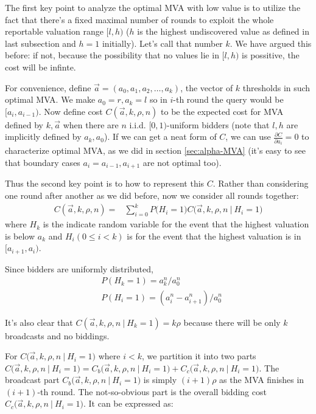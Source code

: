 The first key point to analyze the optimal MVA with low value is to utilize
the fact that there's a fixed maximal number of rounds to exploit the whole
reportable valuation range $[l, h)$ ($h$ is the highest undiscovered
value as defined in last subsection and $h = 1$ initially). Let's call that
number $k$. We have argued this before: if not, because the possibility that no
values lie in $[l, h)$ is possitive, the cost will be infinte.

For convenience, define $\vec a = (a_0, a_1, a_2, \ldots, a_k)$, the vector of
$k$ thresholds in such optimal MVA. We make $a_0 = r, a_k = l$ so in $i$-th
round the query would be $[a_i, a_{i-1})$. Now define cost $C(\vec a, k, \rho,
n)$ to be the expected cost for MVA defined by $k, \vec a$ when there are $n$
i.i.d.  $[0, 1)$-uniform bidders (note that $l, h$ are implicitly defined by
$a_k, a_0$). If we can get a neat form of $C$, we can use $\frac{\partial
C}{\partial a_i} = 0 $ to characterize optimal MVA, as we did in section
\ref{sec:alpha-MVA} (it's easy to see that boundary cases $a_i = a_{i-1},
a_{i+1}$ are not optimal too).

Thus the second key point is to how to represent this $C$. Rather than
considering one round after another as we did before, now we consider all
rounds together:
\begin{align*}
C(\vec a, k, \rho, n) =
&\sum_{i=0}^k P\big(H_i = 1\big) C\big(\vec a, k, \rho, n ~\big|~ H_i = 1 \big)
\end{align*}
where $H_k$ is the indicate random variable for the event that the highest
valuation is below $a_k$ and $H_i(0 \leq i < k)$ is for the event that the highest
valuation is in $[a_{i+1}, a_i)$.

Since bidders are uniformly distributed,
\begin{align*}
  &P(H_k = 1) = a_k^n / a_0^n\\
    &P(H_i = 1) = (a_{i}^n-a_{i+1}^n) / a_0^n
\end{align*}

It's also clear that $C(\vec a, k, \rho, n ~\big|~ H_k = 1) = k\rho$ because
there will be only $k$ broadcasts and no biddings.

For $C\big(\vec a, k, \rho, n ~\big|~ H_i = 1\big)$ where $i < k$, we partition
it into two parts $C\big(\vec a, k, \rho, n ~\big|~ H_i = 1\big) = C_b\big(\vec
a, k, \rho, n ~\big|~ H_i = 1\big) + C_c\big(\vec a, k, \rho, n ~\big|~ H_i =
1\big)$. The broadcast part $C_b\big(\vec a, k, \rho, n ~\big|~ H_i = 1 \big)$
is simply $(i+1)\rho$ as the MVA finishes in $(i+1)$-th round. The
not-so-obvious part is the overall bidding cost $C_c\big(\vec a, k, \rho, n
~\big|~ H_i = 1 \big)$. It can be expressed as:

